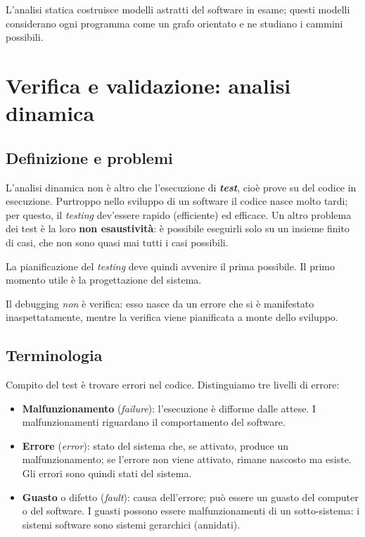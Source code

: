 \documentclass[a4paper]{article}
\begin{document}
		
L'analisi statica costruisce modelli astratti del software in esame; questi modelli considerano ogni programma come un grafo orientato e ne studiano i cammini possibili.
	


		
	\section{Verifica e validazione: analisi dinamica}


		
	\subsection{Definizione e problemi}

		
L'analisi dinamica non è altro che l'esecuzione di \textbf{\emph{test}}, cioè prove su del codice in esecuzione. Purtroppo nello sviluppo di un software il codice nasce molto tardi; per questo, il \emph{testing} dev'essere rapido (efficiente) ed efficace. Un altro problema dei test è la loro \textbf{non esaustività}: è possibile eseguirli solo su un insieme finito di casi, che non sono quasi mai tutti i casi possibili.
		
La pianificazione del \emph{testing} deve quindi avvenire il prima possibile. Il primo momento utile è la progettazione del sistema.
		
Il debugging \emph{non} è verifica: esso nasce da un errore che si è manifestato inaspettatamente, mentre la verifica viene pianificata a monte dello sviluppo.

		
	\subsection{Terminologia}

		
Compito del test è trovare errori nel codice. Distinguiamo tre livelli di errore:
		
	\begin{itemize}
		
			
	\item \textbf{Malfunzionamento} (\emph{failure}): l'esecuzione è difforme dalle attese. I malfunzionamenti riguardano il comportamento del software.
			
	\item \textbf{Errore} (\emph{error}): stato del sistema che, se attivato, produce un malfunzionamento; se l'errore non viene attivato, rimane nascosto ma esiste. Gli errori sono quindi stati del sistema.
			
	\item \textbf{Guasto} o difetto (\emph{fault}): causa dell'errore; può essere un guasto del computer o del software. I guasti possono essere malfunzionamenti di un sotto-sistema: i sistemi software sono sistemi gerarchici (annidati).
		
	\end{itemize}
\end{document}
